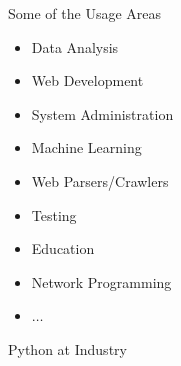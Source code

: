 	\begin{frame}{Some of the Usage Areas \cite{survey_jetbrains2018}}
		\begin{itemize}
			\pause
			\LARGE
			\item Data Analysis
			\pause
			\item Web Development
			\pause
			\item System Administration
			\pause
			\item Machine Learning
			\pause
			\item Web Parsers/Crawlers
			\pause
			\item Testing
			\pause
			\item Education
			\pause
			\item Network Programming
			\pause
			\item $\dots$
		\end{itemize}	
	\end{frame}

	\begin{frame}{Python at Industry}
		\begin{table}[]
		\end{table}
	\end{frame}

